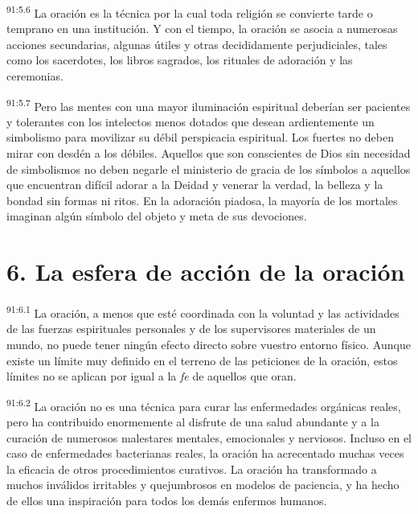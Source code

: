 \documentclass[twoside, 11pt]{book}
\begin{document}
\par
\textsuperscript{91:5.6} La oración es la técnica por la cual toda religión se convierte tarde o temprano en una institución. Y con el tiempo, la oración se asocia a numerosas acciones secundarias, algunas útiles y otras decididamente perjudiciales, tales como los sacerdotes, los libros sagrados, los rituales de adoración y las ceremonias.

\par
\textsuperscript{91:5.7} Pero las mentes con una mayor iluminación espiritual deberían ser pacientes y tolerantes con los intelectos menos dotados que desean ardientemente un simbolismo para movilizar su débil perspicacia espiritual. Los fuertes no deben mirar con desdén a los débiles. Aquellos que son conscientes de Dios sin necesidad de simbolismos no deben negarle el ministerio de gracia de los símbolos a aquellos que encuentran difícil adorar a la Deidad y venerar la verdad, la belleza y la bondad sin formas ni ritos. En la adoración piadosa, la mayoría de los mortales imaginan algún símbolo del objeto y meta de sus devociones.

\section*{6. La esfera de acción de la oración}
\par
\textsuperscript{91:6.1} La oración, a menos que esté coordinada con la voluntad y las actividades de las fuerzas espirituales personales y de los supervisores materiales de un mundo, no puede tener ningún efecto directo sobre vuestro entorno físico. Aunque existe un límite muy definido en el terreno de las peticiones de la oración, estos límites no se aplican por igual a la \textit{fe} de aquellos que oran.

\par
\textsuperscript{91:6.2} La oración no es una técnica para curar las enfermedades orgánicas reales, pero ha contribuido enormemente al disfrute de una salud abundante y a la curación de numerosos malestares mentales, emocionales y nerviosos. Incluso en el caso de enfermedades bacterianas reales, la oración ha acrecentado muchas veces la eficacia de otros procedimientos curativos. La oración ha transformado a muchos inválidos irritables y quejumbrosos en modelos de paciencia, y ha hecho de ellos una inspiración para todos los demás enfermos humanos.
\end{document}

